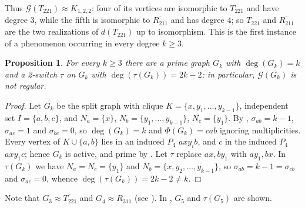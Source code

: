 \documentclass[11pt]{article}
\newtheorem{proposition}[proposition]{Proposition}
\begin{document}
Thus $\mathcal{G}(T_{221})\approx K_{1,2,2}$: four of its vertices are
isomorphic to $T_{221}$ and have degree $3$, while the fifth is
isomorphic to $\overline{R_{211}}$ and has degree $4$; so $T_{221}$ and
$\overline{R_{211}}$ are the two realizations of $d(T_{221})$ up to
isomorphism. This is the first instance of a phenomenon occurring in
every degree $k\geq 3$.

\begin{proposition}
	\label{familia.Gk}
	For every $k\geq 3$ there are a prime graph $G_k$ with $\deg(G_k)=k$
	and a 2-switch $\tau$ on $G_k$ with $\deg(\tau(G_k))=2k-2$; in
	particular, $\mathcal{G}(G_k)$ is not regular.
\end{proposition}

\begin{proof}
	Let $G_k$ be the split graph with clique $K=\{x,y_1,\dots,y_{k-1}\}$,
	independent set $I=\{a,b,c\}$, and $N_a=\{x\}$,
	$N_b=\{y_1,\dots,y_{k-1}\}$, $N_c=\{y_1\}$. By
	, $\sigma_{ab}=k-1$, $\sigma_{ac}=1$ and
	$\sigma_{bc}=0$, so $\deg(G_k)=k$ and $\Phi(G_k)=cab$ ignoring
	multiplicities. Every vertex of $K\cup\{a,b\}$ lies in an induced $P_4$
	$axy_ib$, and $c$ in the induced $P_4$ $axy_1c$; hence $G_k$ is active,
	and prime by . Let $\tau$ replace
	$ax,by_1$ with $ay_1,bx$. In $\tau(G_k)$ we have $N_a=N_c=\{y_1\}$ and
	$N_b=\{x,y_2,\dots,y_{k-1}\}$, so $\sigma_{ab}=k-1=\sigma_{cb}$ and
	$\sigma_{ac}=0$, whence $\deg(\tau(G_k))=2k-2\neq k$.
\end{proof}

Note that $G_3\approx\overline{T_{221}}$ and $G_4\approx R_{311}$ (see
). In , $G_5$ and $\tau(G_5)$ are shown.
\end{document}
